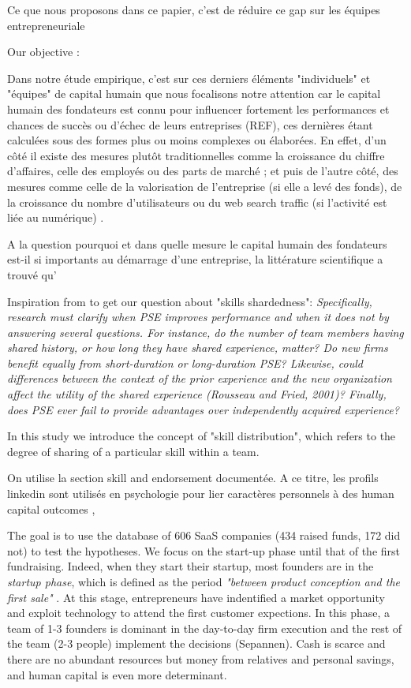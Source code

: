 \documentclass[12pt]{article}
\begin{document}
Ce que nous proposons dans ce papier, c'est de réduire ce gap sur les équipes entrepreneuriale

Our objective :

Dans notre étude empirique, c'est sur ces derniers éléments "individuels" et "équipes" de capital humain que nous focalisons notre attention car le capital humain des fondateurs  est connu pour influencer fortement les performances et chances de succès ou d'échec de leurs entreprises (REF), ces dernières étant calculées sous des formes plus ou moins complexes ou élaborées. En effet, d'un côté il existe des mesures plutôt traditionnelles comme la croissance du chiffre d'affaires, celle des employés ou des parts de marché ; et puis de l'autre côté, des mesures comme celle de la valorisation de l'entreprise (si elle a levé des fonds), de la croissance du nombre d'utilisateurs ou du web search traffic (si l'activité est liée au numérique) \citep{malyy2021value}.

A la question pourquoi et dans quelle mesure le capital humain des fondateurs est-il si importants au démarrage d'une entreprise, la littérature scientifique a trouvé qu'

Inspiration from \citep{zheng2016shared} to get our question about "skills shardedness": \textit{Specifically, research must clarify when PSE improves performance and when it does not by answering several questions. For instance, do the number of team members having shared history, or how long they have shared experience, matter? Do new firms benefit equally from short-duration or long-duration PSE? Likewise, could differences between the context of the prior experience and the new organization affect the utility of the shared experience (Rousseau and Fried, 2001)? Finally, does PSE ever fail to provide advantages over independently acquired experience?}

In this study we introduce the concept of "skill distribution", which refers to the degree of sharing of a particular skill within a team.


On utilise la section skill and endorsement documentée. A ce titre, les profils linkedin sont utilisés en psychologie pour lier caractères personnels à des human capital outcomes \citep{rapanta2017linkedin},

The goal is to use the database of 606 SaaS companies (434 raised funds, 172 did not) to test the hypotheses. We focus on the start-up phase until that of the first fundraising. Indeed, when they start their startup, most founders are in the \textit{startup phase}, which is defined as the period \textit{"between product conception and the first sale"} \citep{crowne2002software}. At this stage, entrepreneurs have indentified a market opportunity and exploit technology to attend the first customer expections. In this phase, a team of 1-3 founders is dominant in the day-to-day firm execution and the rest of the team (2-3 people) implement the decisions (Sepannen). Cash is scarce and there are no abundant resources but money from relatives and personal savings, and human capital is even more determinant.
\end{document}
